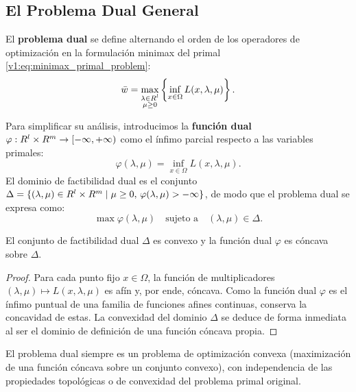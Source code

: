\subsection{El Problema Dual General}

El \textbf{problema dual} se define alternando el orden de los operadores de optimización en la formulación minimax del primal \eqref{v1:eq:minimax_primal_problem}:
\begin{equation}
    \bar{w} = \max_{\substack{\lambda \in R^l \\ \mu \ge 0}} \left\{ \inf_{x \in \Omega} L(x, \lambda, \mu) \right\}.
    \label{v1:eq:minimax_dual}
\end{equation}

Para simplificar su análisis, introducimos la \textbf{función dual} $\varphi : R^l \times R^m \to [-\infty, +\infty)$ como el ínfimo parcial respecto a las variables primales:
\begin{equation}
    \varphi(\lambda, \mu) = \inf_{x \in \Omega} L(x, \lambda, \mu).
\end{equation}
El dominio de factibilidad dual es el conjunto $\Delta = \{(\lambda, \mu) \in R^l \times R^m \mid \mu \ge 0, \, \varphi(\lambda, \mu) > -\infty\}$, de modo que el problema dual se expresa como:
\begin{equation}
    \max \varphi(\lambda, \mu) \quad \text{sujeto a} \quad (\lambda, \mu) \in \Delta.
    \label{v1:eq:dual_general}
\end{equation}

\begin{theorem}\label{v1:thm:propiedades_dual}
    El conjunto de factibilidad dual $\Delta$ es convexo y la función dual $\varphi$ es cóncava sobre $\Delta$.
\end{theorem}

\begin{proof}
    Para cada punto fijo $x \in \Omega$, la función de multiplicadores $(\lambda, \mu) \mapsto L(x, \lambda, \mu)$ es afín y, por ende, cóncava. Como la función dual $\varphi$ es el ínfimo puntual de una familia de funciones afines continuas, conserva la concavidad de estas. La convexidad del dominio $\Delta$ se deduce de forma inmediata al ser el dominio de definición de una función cóncava propia.
\end{proof}

El problema dual siempre es un problema de optimización convexa (maximización de una función cóncava sobre un conjunto convexo), con independencia de las propiedades topológicas o de convexidad del problema primal original.

